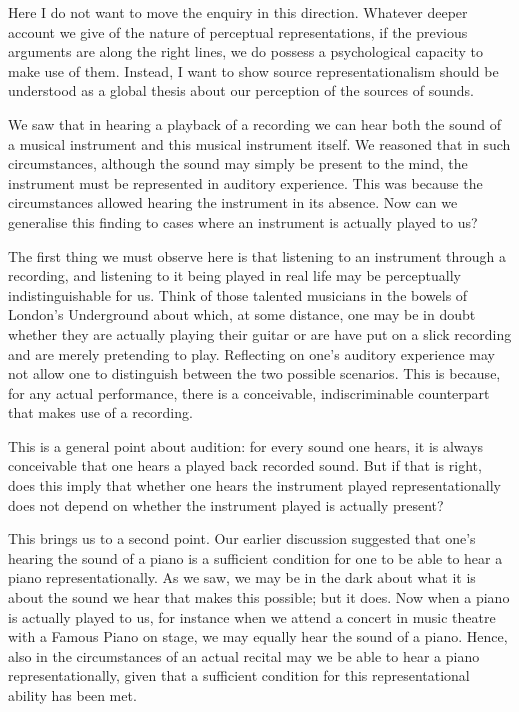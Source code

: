 \documentclass[sloppy, journal, git, bytitle, dodraft]{humapap}
\begin{document}
Here I do not want to move the enquiry in this direction. Whatever deeper account we give of the nature of perceptual representations, if the previous arguments are along the right lines, we do possess a psychological capacity to make use of them. Instead, I want to show source representationalism should be understood as a global thesis about our perception of the sources of sounds. 


\sect We saw that in hearing a playback of a recording we can hear both the sound of a musical instrument and this musical instrument itself. We reasoned that in such circumstances, although the sound may simply be present to the mind, the instrument must be represented in auditory experience. This was because the circumstances allowed hearing the instrument in its absence. Now can we generalise this finding to cases where an instrument is actually played to us? 

The first thing we must observe here is that listening to an instrument through a recording, and listening to it being played in real life may be perceptually indistinguishable for us. Think of those talented musicians in the bowels of London's Underground about which, at some distance, one may be in doubt whether they are actually playing their guitar or are have put on a slick recording and are merely pretending to play. Reflecting on one's auditory experience may not allow one to distinguish between the two possible scenarios. This is because, for any actual performance, there is a conceivable, indiscriminable counterpart that makes use of a recording. 

This is a general point about audition: for every sound one hears, it is always conceivable that one hears a played back recorded sound. But if that is right, does this imply that whether one hears the instrument played representationally does not depend on whether the instrument played is actually present?

This brings us to a second point. Our earlier discussion suggested that one's hearing the sound of a piano is a sufficient condition for one to be able to hear a piano representationally. As we saw, we may be in the dark about what it is about the sound we hear that makes this possible; but it does. Now when a piano is actually played to us, for instance when we attend a concert in music theatre with a Famous Piano on stage, we may equally hear the sound of a piano. Hence, also in the circumstances of an actual recital may we be able to hear a piano representationally, given that a sufficient condition for this representational ability has been met. 
\end{document}

